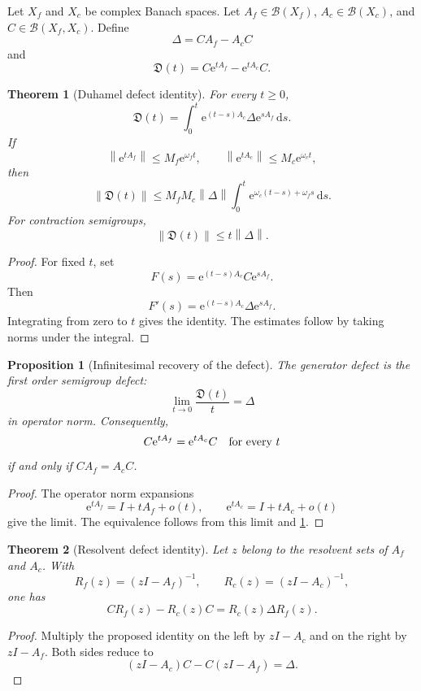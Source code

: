\documentclass{aomart}
\newtheorem{theorem}{Theorem}[section]
\newtheorem{proposition}[proposition]{Proposition}
\theoremstyle{definition}
\theoremstyle{remark}
\newcommand{\e}{\mathrm e}
\newcommand{\dd}{\,\mathrm d}
\newcommand{\norm}[1]{\left\lVert#1\right\rVert}
\begin{document}
Let \(X_f\) and \(X_c\) be complex Banach spaces. Let \(A_f\in\mathcal B(X_f)\), \(A_c\in\mathcal B(X_c)\), and \(C\in\mathcal B(X_f,X_c)\). Define
\[
\Delta=CA_f-A_cC
\]
and
\[
\mathfrak D(t)=C\e^{tA_f}-\e^{tA_c}C.
\]

\begin{theorem}[Duhamel defect identity]\label{thm:duhamel_defect}
For every \(t\geq0\),
\[
\mathfrak D(t)
=
\int_0^t
\e^{(t-s)A_c}\Delta\e^{sA_f}
\dd s.
\]
If
\[
\norm{\e^{tA_f}}\leq M_f\e^{\omega_f t},
\qquad
\norm{\e^{tA_c}}\leq M_c\e^{\omega_c t},
\]
then
\[
\norm{\mathfrak D(t)}
\leq
M_fM_c\norm\Delta
\int_0^t
\e^{\omega_c(t-s)+\omega_fs}
\dd s.
\]
For contraction semigroups,
\[
\norm{\mathfrak D(t)}\leq t\norm\Delta.
\]
\end{theorem}

\begin{proof}
For fixed \(t\), set
\[
F(s)=\e^{(t-s)A_c}C\e^{sA_f}.
\]
Then
\[
F'(s)=\e^{(t-s)A_c}\Delta\e^{sA_f}.
\]
Integrating from zero to \(t\) gives the identity. The estimates follow by taking norms under the integral.
\end{proof}

\begin{proposition}[Infinitesimal recovery of the defect]\label{prop:infinitesimal_defect}
The generator defect is the first order semigroup defect:
\[
\lim_{t\to0}
\frac{\mathfrak D(t)}{t}
=
\Delta
\]
in operator norm. Consequently,
\[
C\e^{tA_f}=\e^{tA_c}C
\quad\hbox{for every }t
\]
if and only if \(CA_f=A_cC\).
\end{proposition}

\begin{proof}
The operator norm expansions
\[
\e^{tA_f}=I+tA_f+o(t),
\qquad
\e^{tA_c}=I+tA_c+o(t)
\]
give the limit. The equivalence follows from this limit and \cref{thm:duhamel_defect}.
\end{proof}

\begin{theorem}[Resolvent defect identity]\label{thm:resolvent_defect}
Let \(z\) belong to the resolvent sets of \(A_f\) and \(A_c\). With
\[
R_f(z)=(zI-A_f)^{-1},
\qquad
R_c(z)=(zI-A_c)^{-1},
\]
one has
\[
CR_f(z)-R_c(z)C
=
R_c(z)\Delta R_f(z).
\]
\end{theorem}

\begin{proof}
Multiply the proposed identity on the left by \(zI-A_c\) and on the right by \(zI-A_f\). Both sides reduce to
\[
(zI-A_c)C-C(zI-A_f)=\Delta.
\]
\end{proof}
\end{document}
